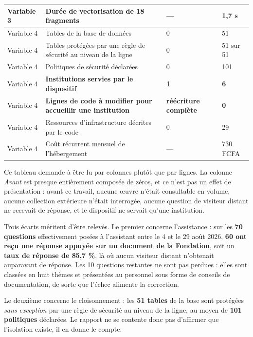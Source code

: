 \begin{table}[htbp]
\begin{tabularx}{\textwidth}{|C{1.6cm}|X|C{2.2cm}|C{2.6cm}|}
Variable 3 & Durée de vectorisation de 18 fragments & --- & 1,7 s \\ \hline
Variable 4 & Tables de la base de données & 0 & 51 \\ \hline
Variable 4 & Tables protégées par une règle de sécurité au niveau de la ligne & 0 & 51 sur 51 \\ \hline
Variable 4 & Politiques de sécurité déclarées & 0 & 101 \\ \hline
Variable 4 & \textbf{Institutions servies par le dispositif} & \textbf{1} & \textbf{6} \\ \hline
Variable 4 & \textbf{Lignes de code à modifier pour accueillir une institution} & \textbf{réécriture complète} & \textbf{0} \\ \hline
Variable 4 & Ressources d'infrastructure décrites par le code & 0 & 29 \\ \hline
Variable 4 & Coût récurrent mensuel de l'hébergement & --- & 730 FCFA \\ \hline
\end{tabularx}
\end{table}

Ce tableau demande à être lu par colonnes plutôt que par lignes. La colonne
\emph{Avant} est presque entièrement composée de zéros, et ce n'est pas un effet
de présentation : avant ce travail, aucune œuvre n'était consultable en volume,
aucune collection extérieure n'était interrogée, aucune question de visiteur
distant ne recevait de réponse, et le dispositif ne servait qu'une institution.

Trois écarts méritent d'être relevés. Le premier concerne l'assistance : sur les
\textbf{70 questions} effectivement posées à l'assistant entre le 4 et le
29 août 2026, \textbf{60 ont reçu une réponse appuyée sur un document de la
Fondation}, soit un \textbf{taux de réponse de 85,7 \%}, là où aucun visiteur
distant n'obtenait auparavant de réponse. Les 10 questions restantes ne sont pas
perdues : elles sont classées en huit thèmes et présentées au personnel sous
forme de conseils de documentation, de sorte que l'échec alimente la correction.

Le deuxième concerne le cloisonnement : les \textbf{51 tables} de la base sont
protégées \emph{sans exception} par une règle de sécurité au niveau de la ligne,
au moyen de \textbf{101 politiques} déclarées. Le rapport ne se contente donc pas
d'affirmer que l'isolation existe, il en donne le compte.

